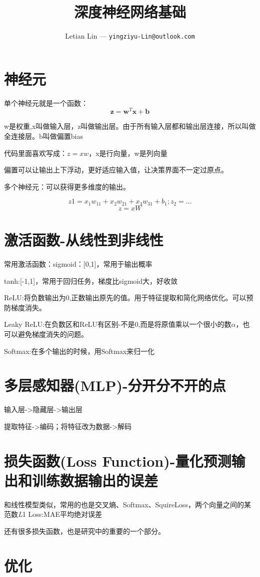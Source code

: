 \documentclass[UTF8]{ctexart}
\title{
	深度神经网络基础
}
\author{
	Letian Lin --- \texttt{yingziyu-Lin@outlook.com}
}
\begin{document}
\maketitle
\section{神经元}
单个神经元就是一个函数：$$\mathbf{z}=\mathbf{w}^T\mathbf{x}+\textbf{b}$$

w是权重,x叫做输入层，z叫做输出层。由于所有输入层都和输出层连接，所以叫做全连接层。b叫做偏置bias

代码里面喜欢写成：$z=xw$，x是行向量，w是列向量

偏置可以让输出上下浮动，更好适应输入值，让决策界面不一定过原点。

多个神经元：可以获得更多维度的输出。

$$z1=x_1w_{11}+x_2w_{21}+x_3w_{31}+b_1;z_2=\dots$$
$$z=xW$$

\section{激活函数-从线性到非线性}
常用激活函数：sigmoid：[0,1]，常用于输出概率

tanh:[-1,1]，常用于回归任务，梯度比sigmoid大，好收敛

ReLU:将负数输出为0,正数输出原先的值。用于特征提取和简化网络优化。可以预防梯度消失。

Leaky ReLU:在负数区和ReLU有区别-不是0,而是将原值乘以一个很小的数$\alpha$，也可以避免梯度消失的问题。

Softmax:在多个输出的时候，用Softmax来归一化

\section{多层感知器(MLP)-分开分不开的点}

输入层->隐藏层->输出层

提取特征->编码；将特征改为数据->解码

\section{损失函数(Loss Function)-量化预测输出和训练数据输出的误差}

和线性模型类似，常用的也是交叉熵、Softmax、SquireLoss，两个向量之间的某范数\textit{L}1 Loss:MAE平均绝对误差

还有很多损失函数，也是研究中的重要的一个部分。

\section{优化}
\end{document}
